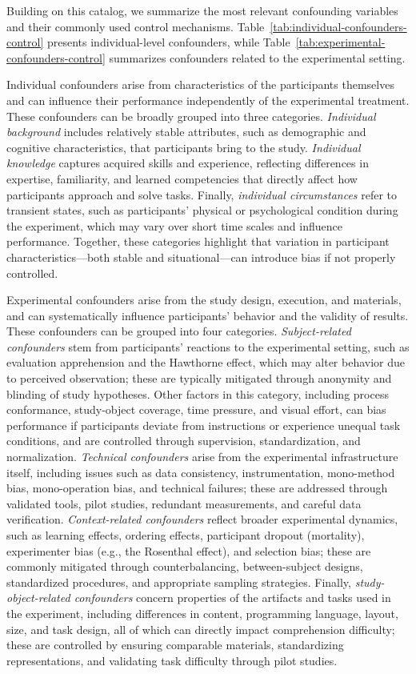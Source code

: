 Building on this catalog, we summarize the most relevant confounding variables and their commonly used control mechanisms. Table~\ref{tab:individual-confounders-control} presents individual-level confounders, while Table~\ref{tab:experimental-confounders-control} summarizes confounders related to the experimental setting.

Individual confounders arise from characteristics of the participants themselves and can influence their performance independently of the experimental treatment. These confounders can be broadly grouped into three categories. \textit{Individual background} includes relatively stable attributes, such as demographic and cognitive characteristics, that participants bring to the study. \textit{Individual knowledge} captures acquired skills and experience, reflecting differences in expertise, familiarity, and learned competencies that directly affect how participants approach and solve tasks. Finally, \textit{individual circumstances} refer to transient states, such as participants’ physical or psychological condition during the experiment, which may vary over short time scales and influence performance. Together, these categories highlight that variation in participant characteristics—both stable and situational—can introduce bias if not properly controlled.

Experimental confounders arise from the study design, execution, and materials, and can systematically influence participants’ behavior and the validity of results. These confounders can be grouped into four categories. \textit{Subject-related confounders} stem from participants’ reactions to the experimental setting, such as evaluation apprehension and the Hawthorne effect, which may alter behavior due to perceived observation; these are typically mitigated through anonymity and blinding of study hypotheses. Other factors in this category, including process conformance, study-object coverage, time pressure, and visual effort, can bias performance if participants deviate from instructions or experience unequal task conditions, and are controlled through supervision, standardization, and normalization. \textit{Technical confounders} arise from the experimental infrastructure itself, including issues such as data consistency, instrumentation, mono-method bias, mono-operation bias, and technical failures; these are addressed through validated tools, pilot studies, redundant measurements, and careful data verification. \textit{Context-related confounders} reflect broader experimental dynamics, such as learning effects, ordering effects, participant dropout (mortality), experimenter bias (e.g., the Rosenthal effect), and selection bias; these are commonly mitigated through counterbalancing, between-subject designs, standardized procedures, and appropriate sampling strategies. Finally, \textit{study-object-related confounders} concern properties of the artifacts and tasks used in the experiment, including differences in content, programming language, layout, size, and task design, all of which can directly impact comprehension difficulty; these are controlled by ensuring comparable materials, standardizing representations, and validating task difficulty through pilot studies.

